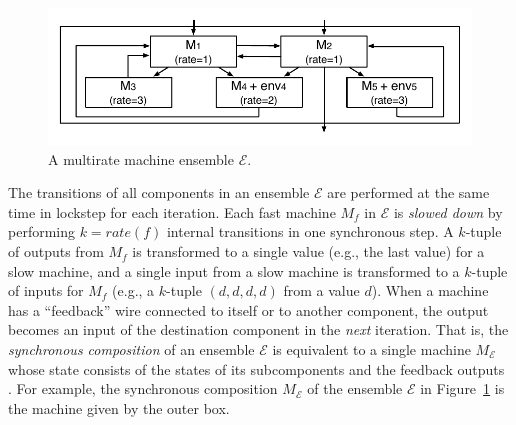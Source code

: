 \documentclass{sig-alternate}
\begin{document}
\begin{figure}
\centering
\includegraphics[clip=true,trim=0.3cm 0.4cm 0.3cm 0.4cm,width=1.0\columnwidth]{ensemble.pdf}    
\caption{A multirate machine ensemble $\mathcal{E}$.
}  \label{fig:ensemble}
\end{figure}



The transitions of all components in an ensemble $\mathcal{E}$
are performed at the same time in lockstep for each iteration.
Each fast machine $M_f$ in $\mathcal{E}$ is \emph{slowed down} 
by performing $k = \mathit{rate}(f)$ internal transitions  in one synchronous step.
A $k$-tuple of outputs from $M_f$  is transformed to 
a single value (e.g., the last value) %
for a slow machine,
and a single input  from a slow machine
is transformed to a $k$-tuple of inputs for $M_f$
(e.g., a $k$-tuple $(d, d, d, d)$ from a value $d$).
%
When a machine has a ``feedback'' wire connected to itself or to another component,
the output becomes an input of the destination component in the \emph{next} iteration.
That is,
the \emph{synchronous composition}  of an ensemble $\mathcal{E}$
is equivalent to a single machine $M_\mathcal{E}$
whose state consists of the states of its subcomponents
and the feedback outputs \cite{mr-pals-journal,pals-tcs}.
For example, 
the synchronous composition $M_\mathcal{E}$ 
of the ensemble $\mathcal{E}$ in Figure~\ref{fig:ensemble} 
is the machine given by the outer box. 

\end{document}
